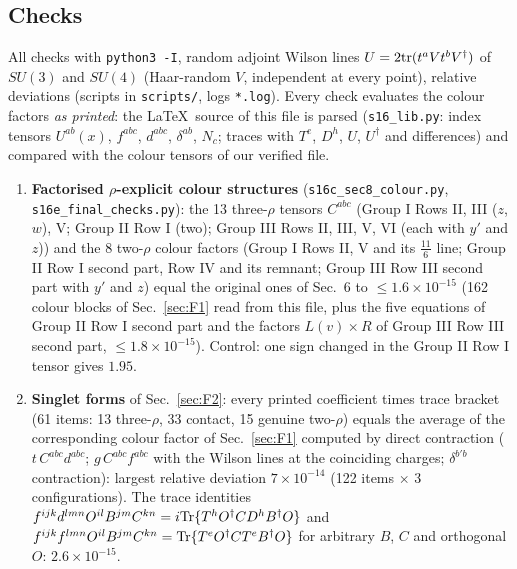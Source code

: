 \subsection{Checks}\label{sec:F3}
\noindent All checks with \texttt{python3 -I}, random adjoint Wilson lines $U=2{\rm tr}(t^{a}Vt^{b}V^{\dagger})$ of $SU(3)$ and $SU(4)$ (Haar-random $V$, independent at every point), relative deviations (scripts in \texttt{scripts/}, logs \texttt{*.log}). Every check evaluates the colour factors \emph{as printed}: the \LaTeX\ source of this file is parsed (\texttt{s16\_lib.py}: index tensors $U^{ab}(x)$, $f^{abc}$, $d^{abc}$, $\delta^{ab}$, $N_{c}$; traces with $T^{e}$, $D^{h}$, $U$, $U^{\dagger}$ and differences) and compared with the colour tensors of our verified file.
\begin{enumerate}
\item \textbf{Factorised $\rho$-explicit colour structures} (\texttt{s16c\_sec8\_colour.py}, \texttt{s16e\_final\_checks.py}): the 13 three-$\rho$ tensors $C^{abc}$ (Group I Rows II, III ($z$, $w$), V; Group II Row I (two); Group III Rows II, III, V, VI (each with $y'$ and $z$)) and the 8 two-$\rho$ colour factors (Group I Rows II, V and its $\frac{11}{6}$ line; Group II Row I second part, Row IV and its remnant; Group III Row III second part with $y'$ and $z$) equal the original ones of Sec.~6 to $\le1.6\times10^{-15}$ (162 colour blocks of Sec.~\ref{sec:F1} read from this file, plus the five equations of Group II Row I second part and the factors $L(v)\times R$ of Group III Row III second part, $\le1.8\times10^{-15}$). Control: one sign changed in the Group II Row I tensor gives $1.95$.
\item \textbf{Singlet forms} of Sec.~\ref{sec:F2}: every printed coefficient times trace bracket (61 items: 13 three-$\rho$, 33 contact, 15 genuine two-$\rho$) equals the average of the corresponding colour factor of Sec.~\ref{sec:F1} computed by direct contraction ($t\,C^{abc}d^{abc}$; $g\,C^{abc}f^{abc}$ with the Wilson lines at the coinciding charges; $\delta^{b'b}$ contraction): largest relative deviation $7\times10^{-14}$ (122 items $\times$ 3 configurations). The trace identities $f^{ijk}d^{lmn}O^{il}B^{jm}C^{kn}=i{\rm Tr}\{T^{h}O^{\dagger}CD^{h}B^{\dagger}O\}$ and $f^{ijk}f^{lmn}O^{il}B^{jm}C^{kn}={\rm Tr}\{T^{e}O^{\dagger}CT^{e}B^{\dagger}O\}$ for arbitrary $B$, $C$ and orthogonal $O$: $2.6\times10^{-15}$.

\end{enumerate}
